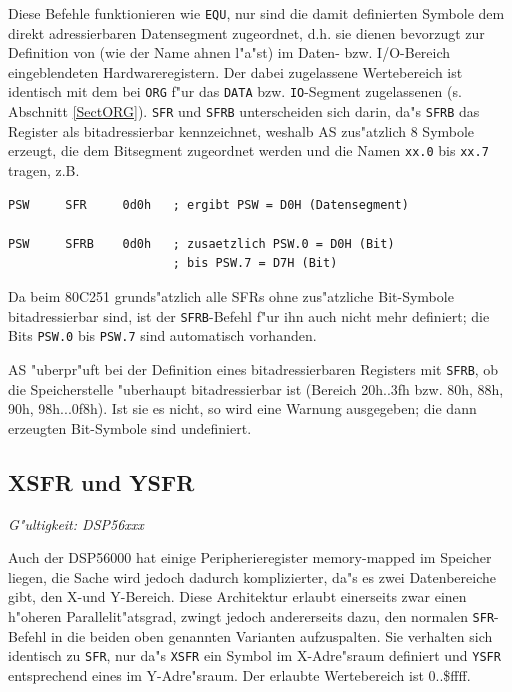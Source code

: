 \documentclass[12pt,a4paper,twoside]{report}
\makeatletter
\newcommand{\tty}[1]{{\tt #1}}
\newcommand{\ttindex}[1]{\index{#1@{\tt #1}}}
\newcommand{\asname}{AS}
\makeatother
\begin{document}
Diese Befehle funktionieren wie \tty{EQU}, nur sind die damit definierten
Symbole dem direkt adressierbaren Datensegment zugeordnet, d.h. sie
dienen bevorzugt zur Definition von (wie der Name ahnen l"a"st) im Daten- bzw.
I/O-Bereich eingeblendeten Hardwareregistern.  Der dabei zugelassene
Wertebereich ist identisch mit dem bei \tty{ORG} f"ur das \tty{DATA} bzw.
\tty{IO}-Segment zugelassenen (s. Abschnitt \ref{SectORG}).
\tty{SFR} und \tty{SFRB} unterscheiden sich darin,  da"s \tty{SFRB}
das Register als bitadressierbar kennzeichnet, weshalb \asname{} zus"atzlich 8
Symbole erzeugt, die dem Bitsegment zugeordnet werden und die Namen
\tty{xx.0} bis \tty{xx.7} tragen, z.B.
\begin{verbatim}
PSW     SFR     0d0h   ; ergibt PSW = D0H (Datensegment)

PSW     SFRB    0d0h   ; zusaetzlich PSW.0 = D0H (Bit)
                       ; bis PSW.7 = D7H (Bit)
\end{verbatim}
Da beim 80C251 grunds"atzlich alle SFRs ohne zus"atzliche Bit-Symbole
bitadressierbar sind, ist der \tty{SFRB}-Befehl f"ur ihn auch nicht mehr
definiert; die Bits \tty{PSW.0} bis \tty{PSW.7} sind automatisch vorhanden.
\par
\asname{} "uberpr"uft bei der Definition eines bitadressierbaren Registers mit
\tty{SFRB}, ob die Speicherstelle "uberhaupt bitadressierbar ist (Bereich
20h..3fh bzw. 80h, 88h, 90h, 98h...0f8h).  Ist sie es nicht, so wird eine
Warnung ausgegeben; die dann erzeugten Bit-Symbole sind undefiniert.



\subsection{XSFR und YSFR}
\ttindex{XSFR}\ttindex{YSFR}

{\em G"ultigkeit: DSP56xxx}

Auch der DSP56000 hat einige Peripherieregister memory-mapped im
Speicher liegen, die Sache wird jedoch dadurch komplizierter, da"s
es zwei Datenbereiche gibt, den X-und Y-Bereich.  Diese Architektur
erlaubt einerseits zwar einen h"oheren Parallelit"atsgrad, zwingt
jedoch andererseits dazu, den normalen \tty{SFR}-Befehl in die beiden
oben genannten Varianten aufzuspalten.  Sie verhalten sich identisch zu
\tty{SFR}, nur da"s \tty{XSFR} ein Symbol im X-Adre"sraum definiert
und \tty{YSFR} entsprechend eines im Y-Adre"sraum.  Der erlaubte
Wertebereich ist 0..\$ffff.
\end{document}
